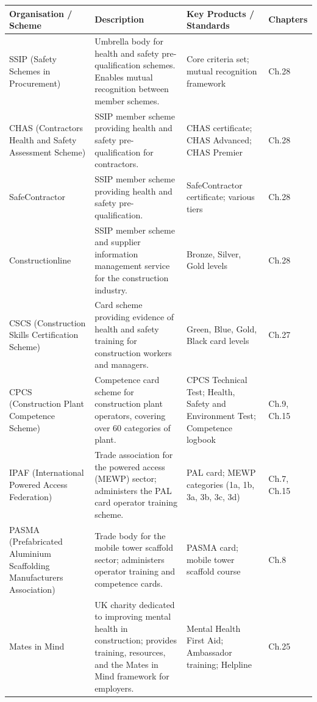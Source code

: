 \begin{table}[H]
\centering
\small
\begin{tabularx}{\textwidth}{>{\raggedright\arraybackslash}p{3.0cm}>{\raggedright\arraybackslash}p{4.5cm}>{\raggedright\arraybackslash}p{3.0cm}>{\raggedright\arraybackslash}X}
\toprule
\textbf{Organisation / Scheme} & \textbf{Description} & \textbf{Key Products / Standards} & \textbf{Chapters} \\
\midrule
SSIP (Safety Schemes in Procurement) & Umbrella body for health and safety pre-qualification schemes. Enables mutual recognition between member schemes. & Core criteria set; mutual recognition framework & Ch.28 \\
\midrule
CHAS (Contractors Health and Safety Assessment Scheme) & SSIP member scheme providing health and safety pre-qualification for contractors. & CHAS certificate; CHAS Advanced; CHAS Premier & Ch.28 \\
\midrule
SafeContractor & SSIP member scheme providing health and safety pre-qualification. & SafeContractor certificate; various tiers & Ch.28 \\
\midrule
Constructionline & SSIP member scheme and supplier information management service for the construction industry. & Bronze, Silver, Gold levels & Ch.28 \\
\midrule
CSCS (Construction Skills Certification Scheme) & Card scheme providing evidence of health and safety training for construction workers and managers. & Green, Blue, Gold, Black card levels & Ch.27 \\
\midrule
CPCS (Construction Plant Competence Scheme) & Competence card scheme for construction plant operators, covering over 60 categories of plant. & CPCS Technical Test; Health, Safety and Environment Test; Competence logbook & Ch.9, Ch.15 \\
\midrule
IPAF (International Powered Access Federation) & Trade association for the powered access (MEWP) sector; administers the PAL card operator training scheme. & PAL card; MEWP categories (1a, 1b, 3a, 3b, 3c, 3d) & Ch.7, Ch.15 \\
\midrule
PASMA (Prefabricated Aluminium Scaffolding Manufacturers Association) & Trade body for the mobile tower scaffold sector; administers operator training and competence cards. & PASMA card; mobile tower scaffold course & Ch.8 \\
\midrule
Mates in Mind & UK charity dedicated to improving mental health in construction; provides training, resources, and the Mates in Mind framework for employers. & Mental Health First Aid; Ambassador training; Helpline & Ch.25 \\

\end{tabularx}
\end{table}
